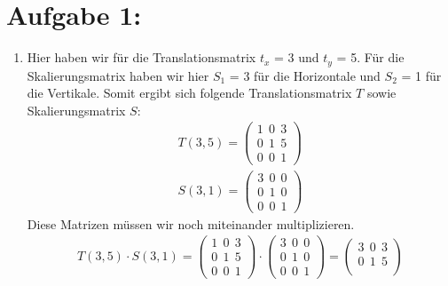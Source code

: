 \documentclass[11pt]{article}
\begin{document}
\section*{Aufgabe 1:}
\begin{enumerate}
  \item Hier haben wir für die Translationsmatrix $t_x$ = 3 und $t_y$ = 5. Für die Skalierungsmatrix haben wir hier $S_1$ = 3 für die Horizontale und $S_2$ = 1 für die Vertikale. Somit ergibt sich folgende Translationsmatrix $T$ sowie Skalierungsmatrix $S$:
        \begin{align*}
          T(3, 5) = \begin{pmatrix*}
                      1~~0~~3 \\
                      0~~1~~5 \\
                      0~~0~~1
                    \end{pmatrix*} \\
          S(3, 1) = \begin{pmatrix*}
                      3~~0~~ 0 \\
                      0~~1~~ 0 \\
                      0~~0~~ 1
                    \end{pmatrix*}
        \end{align*}
        Diese Matrizen müssen wir noch miteinander multiplizieren.
        \begin{align*}
          T(3, 5) \cdot S(3, 1) = \begin{pmatrix*}
                                    1~~0~~3 \\
                                    0~~1~~5 \\
                                    0~~0~~1
                                  \end{pmatrix*} \cdot \begin{pmatrix*}
                                                         3~~0~~ 0 \\
                                                         0~~1~~ 0 \\
                                                         0~~0~~ 1
                                                       \end{pmatrix*} = \begin{pmatrix*}
                                                                          3~~0~~3 \\
                                                                          0~~1~~5 \\

\end{pmatrix*}
\end{align*}
\end{enumerate}
\end{document}
